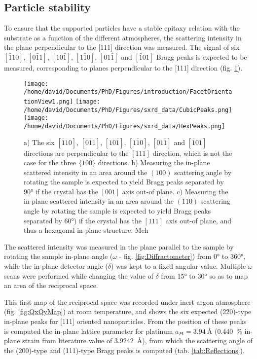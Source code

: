 \subsection{Particle stability}

To ensure that the  supported particles have a stable epitaxy relation with the substrate as a function of the different atmospheres, the scattering intensity in the plane perpendicular to the [111] direction was measured.
The signal of six $[\bar{1}10]$, $[0\bar{1}1]$, $[10\bar{1}]$, $[1\bar{1}0]$, $[01\bar{1}]$ and $[\bar{1}01]$ Bragg peaks is expected to be measured, corresponding to planes perpendicular to the [111] direction (fig. \ref{fig:Orientations}).

\begin{figure}[!htb]
    \centering
    \texttt{[image: /home/david/Documents/PhD/Figures/introduction/FacetOrientationView1.png]}
    \texttt{[image: /home/david/Documents/PhD/Figures/sxrd\_data/CubicPeaks.png]}
    \texttt{[image: /home/david/Documents/PhD/Figures/sxrd\_data/HexPeaks.png]}
    \caption{
        a) The six $[\bar{1}10]$, $[0\bar{1}1]$, $[10\bar{1}]$, $[1\bar{1}0]$, $[01\bar{1}]$ and $[\bar{1}01]$ directions are perpendicular to the $[111]$ direction, which is not the case for the three $\{100\}$ directions.
        b) Measuring the in-plane scattered intensity in an area around the $(100)$ scattering angle by rotating the sample is expected to yield Bragg peaks separated by \ang{90} if the crystal has the $[001]$ axis out-of plane.
        c) Measuring the in-plane scattered intensity in an area around the $(110)$ scattering angle by rotating the sample is expected to yield Bragg peaks separated by \ang{60}) if the crystal has the $[111]$ axis out-of plane, and thus a hexagonal in-plane structure.
        \textcolor{Important}{Meh}
    }
    \label{fig:Orientations}
\end{figure}

The scattered intensity was measured in the plane parallel to the sample by rotating the sample in-plane angle ($\omega$ - fig. \ref{fig:Diffractometer}) from \ang{0} to \ang{360}, while the in-plane detector angle ($\delta$) was kept to a fixed angular value.
Multiple $\omega$ scans were performed while changing the value of $\delta$ from \ang{15} to \ang{30} so as to map an area of the reciprocal space.

This first map of the reciprocal space was recorded under inert argon atmosphere (fig. \ref{fig:QxQyMap}) at room temperature, and shows the six expected (220)-type in-plane peaks for [111] oriented nanoparticles.
From the position of these peaks is computed the in-plane lattice parameter for platinum $a_{Pt}=\qty{3.94}{\angstrom}$ (\qty{0.440}{\percent} in-plane strain from literature value of \qty{3.9242}{\angstrom}), from which the scattering angle of the (200)-type and (111)-type Bragg peaks is computed (tab. \ref{tab:Reflections}).

